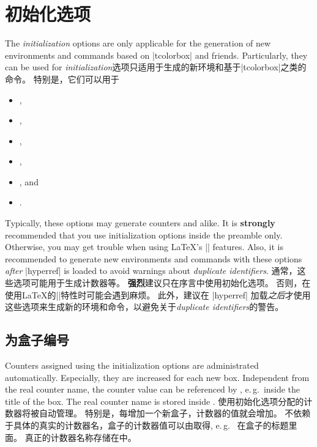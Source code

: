 
\section{初始化选项}\label{sec:initkeys}%
%
\begin{stripedbox}
The \emph{initialization} options are only applicable for the generation
of new environments and commands based on |tcolorbox| and friends.
Particularly, they can be used for
\tcblower
\emph{initialization}选项只适用于生成的新环境和基于|tcolorbox|之类的命令。%
特别是，它们可以用于
\end{stripedbox}

\begin{itemize}
\item{},
\item{},
\item{},
\item{},
\item{}, and
\item{}.
\end{itemize}

\bigskip
\begin{marker}
\begin{stripedbox}[blank]
Typically, these options may generate counters and alike.
It is \textbf{strongly} recommended that you use initialization options inside the preamble only. 
Otherwise, you may get trouble when using \LaTeX's || features.
Also, it is recommended to generate new environments and commands with these
options \emph{after} |hyperref| is loaded to avoid warnings about \emph{duplicate identifiers}.
\tcblower
通常，这些选项可能用于生成计数器等。%
\textbf{强烈}建议只在序言中使用初始化选项。%
否则，在使用\LaTeX 的||特性时可能会遇到麻烦。
此外，建议在 |hyperref| 加载\emph{之后}才使用这些选项来生成新的环境和命令，以避免关于\emph{duplicate identifiers}的警告。
\end{stripedbox}
\end{marker}


\subsection{为盒子编号}\label{sec:numberedboxes}
\begin{stripedbox}
Counters assigned using the initialization options are administrated automatically.
Especially, they are increased for each new box.
Independent from the real counter name, 
the counter value can be referenced by , e.\,g.\ 
inside the title of the box. 
The real counter name is stored inside .
\tcblower
使用初始化选项分配的计数器将被自动管理。%
特别是，每增加一个新盒子，计数器的值就会增加。%
不依赖于具体的真实的计数器名，盒子的计数器值可以由取得, e.\,g.\ %
在盒子的标题里面。%
真正的计数器名称存储在中。
\end{stripedbox}


